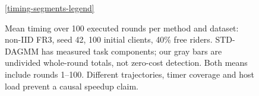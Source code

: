\begin{figure}[tp]
\par\ref{timing-segments-legend}
\caption{Mean timing over 100 executed rounds per method and dataset: non-IID FR3, seed 42, 100 initial clients, 40\% free riders. STD-DAGMM has measured task components; our gray bars are undivided whole-round totals, not zero-cost detection. Both means include rounds 1--100. Different trajectories, timer coverage and host load prevent a causal speedup claim.}\label{fig:timing-segments}
\end{figure}
